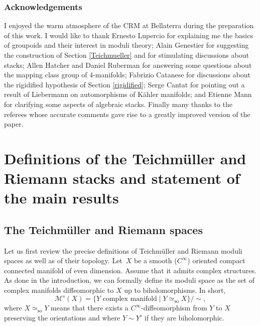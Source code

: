 \documentclass[10pt]{amsart}
\let\mathcal\mathscr
\newcommand{\so}{\mathrm{so}}
\theoremstyle{plain}
\theoremstyle{definition}
\theoremstyle{remark}
\numberwithin{equation}{section}
\begin{document}
\subsubsection*{Acknowledgements}
I enjoyed the warm atmosphere of the CRM at Bellaterra during the preparation of this work. I would like to thank Ernesto Lupercio for explaining me the basics of groupoids and their interest in moduli theory; Alain Genestier for suggesting the construction of Section \ref{Teichmueller} and for stimulating discussions about stacks; Allen Hatcher and Daniel Ruberman for answering some questions about the mapping class group of $4$-manifolds; Fabrizio Catanese for discussions about the rigidified hypothesis of Section \ref{rigidified}; Serge Cantat for pointing out a result of Liebermann on automorphisms of Kähler manifolds; and Etienne Mann for clarifying some aspects of algebraic stacks. Finally many thanks to the referees whose accurate comments gave rise to a greatly improved version of the paper.

\section{Definitions of the Teichmüller and Riemann stacks and statement of the main results}
\label{notations}

\subsection{The Teichmüller and Riemann spaces}
\label{TRspaces}
Let us first review the precise definitions of Teichmüller and Riemann moduli spaces as well as of their topology. Let~$X$ be a smooth (\ie $C^\infty$) oriented compact connected manifold of even dimension. Assume that it admits complex structures. As done in the introduction, we can formally define its moduli space as the set of complex manifolds diffeomorphic to $X$ up to biholomorphisms. In short,
\begin{equation}
\label{M}
\mathcal M^s(X)=\{Y\text{ complex manifold}\mid Y\simeq_{\so} X\}/\sim,
\end{equation}
where $X\simeq_{\so}Y$ means that there exists a $C^\infty$-diffeomorphism from $Y$ to $X$ preserving the orientations and where $Y\sim Y'$ if they are biholomorphic.
\end{document}
